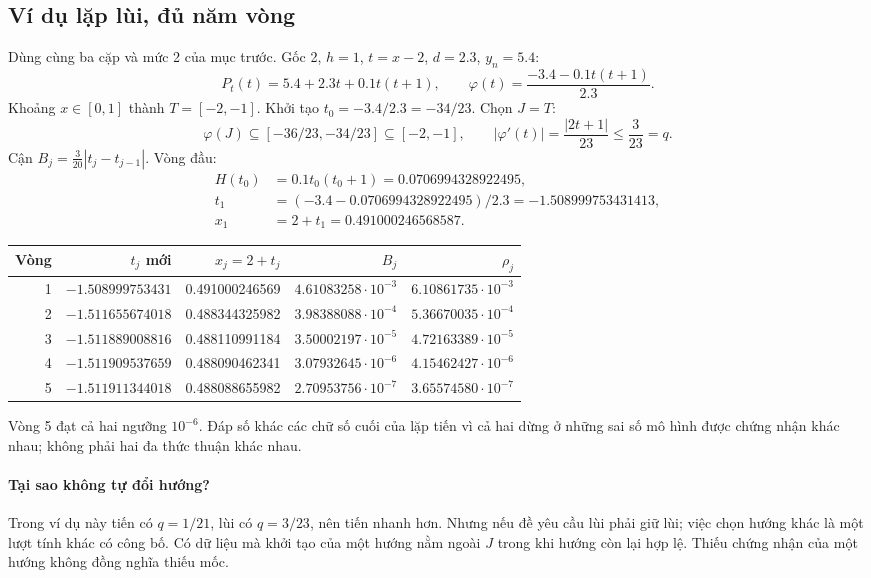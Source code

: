 \subsection{Ví dụ lặp lùi, đủ năm vòng}
Dùng cùng ba cặp và mức 2 của mục trước. Gốc 2, $h=1$, $t=x-2$, $d=2.3$, $y_n=5.4$:
\[
 P_t(t)=5.4+2.3t+0.1t(t+1),\qquad
 \varphi(t)=\frac{-3.4-0.1t(t+1)}{2.3}.
\]
Khoảng $x\in[0,1]$ thành $T=[-2,-1]$. Khởi tạo $t_0=-3.4/2.3=-34/23$. Chọn $J=T$:
\[
 \varphi(J)\subseteq[-36/23,-34/23]\subseteq[-2,-1],\qquad
 |\varphi'(t)|=\frac{|2t+1|}{23}\le\frac3{23}=q.
\]
Cận $B_j=\frac3{20}|t_j-t_{j-1}|$. Vòng đầu:
\begin{align*}
H(t_0)&=0.1t_0(t_0+1)=0.0706994328922495,\\
t_1&=(-3.4-0.0706994328922495)/2.3=-1.508999753431413,\\
x_1&=2+t_1=0.491000246568587.
\end{align*}
\begin{center}\small
\begin{tabular}{@{}rrrrr@{}}\toprule
Vòng & $t_j$ mới & $x_j=2+t_j$ & $B_j$ & $\rho_j$\\\midrule
1 & $-1.508999753431$ & 0.491000246569 & $4.61083258\cdot10^{-3}$ & $6.10861735\cdot10^{-3}$\\
2 & $-1.511655674018$ & 0.488344325982 & $3.98388088\cdot10^{-4}$ & $5.36670035\cdot10^{-4}$\\
3 & $-1.511889008816$ & 0.488110991184 & $3.50002197\cdot10^{-5}$ & $4.72163389\cdot10^{-5}$\\
4 & $-1.511909537659$ & 0.488090462341 & $3.07932645\cdot10^{-6}$ & $4.15462427\cdot10^{-6}$\\
5 & $-1.511911344018$ & 0.488088655982 & $2.70953756\cdot10^{-7}$ & $3.65574580\cdot10^{-7}$\\\bottomrule
\end{tabular}\end{center}
Vòng 5 đạt cả hai ngưỡng $10^{-6}$. Đáp số khác các chữ số cuối của lặp tiến vì cả hai dừng ở những sai số mô hình được chứng nhận khác nhau; không phải hai đa thức thuận khác nhau.

\paragraph{Tại sao không tự đổi hướng?} Trong ví dụ này tiến có $q=1/21$, lùi có $q=3/23$, nên tiến nhanh hơn. Nhưng nếu đề yêu cầu lùi phải giữ lùi; việc chọn hướng khác là một lượt tính khác có công bố. Có dữ liệu mà khởi tạo của một hướng nằm ngoài $J$ trong khi hướng còn lại hợp lệ. Thiếu chứng nhận của một hướng không đồng nghĩa thiếu mốc.

